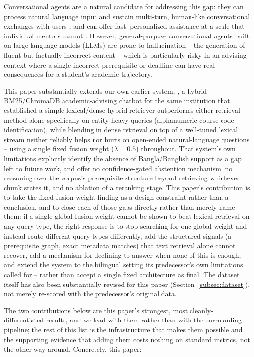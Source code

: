 \documentclass[a4paper,twoside]{article}
\begin{document}
Conversational agents are a natural candidate for addressing this gap: they can process natural language input and sustain multi-turn, human-like conversational exchanges with users \citep{brandtzaeg2017}, and can offer fast, personalized assistance at a scale that individual mentors cannot \citep{shawar2007}. However, general-purpose conversational agents built on large language models (LLMs) are prone to hallucination -- the generation of fluent but factually incorrect content -- which is particularly risky in an advising context where a single incorrect prerequisite or deadline can have real consequences for a student's academic trajectory.

This paper substantially extends our own earlier system, \citet{rahman2025mentorship}, a hybrid BM25/ChromaDB academic-advising chatbot for the same institution that established a simple lexical/dense hybrid retriever outperforms either retrieval method alone specifically on entity-heavy queries (alphanumeric course-code identification), while blending in dense retrieval on top of a well-tuned lexical stream neither reliably helps nor hurts on open-ended natural-language questions -- using a single fixed fusion weight ($\lambda=0.5$) throughout. That system's own limitations explicitly identify the absence of Bangla/Banglish support as a gap left to future work, and offer no confidence-gated abstention mechanism, no reasoning over the corpus's prerequisite structure beyond retrieving whichever chunk states it, and no ablation of a reranking stage. This paper's contribution is to take the fixed-fusion-weight finding as a design constraint rather than a conclusion, and to close each of those gaps directly rather than merely name them: if a single global fusion weight cannot be shown to beat lexical retrieval on any query type, the right response is to stop searching for one global weight and instead route different query types differently, add the structured signals (a prerequisite graph, exact metadata matches) that text retrieval alone cannot recover, add a mechanism for declining to answer when none of this is enough, and extend the system to the bilingual setting its predecessor's own limitations called for -- rather than accept a single fixed architecture as final. The dataset itself has also been substantially revised for this paper (Section~\ref{subsec:dataset}), not merely re-scored with the predecessor's original data.

The two contributions below are this paper's strongest, most cleanly-differentiated results, and we lead with them rather than with the surrounding pipeline; the rest of this list is the infrastructure that makes them possible and the supporting evidence that adding them costs nothing on standard metrics, not the other way around. Concretely, this paper:
\end{document}
